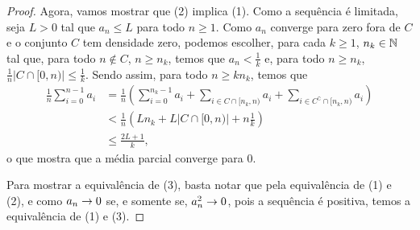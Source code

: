 \begin{proof}
Agora, vamos mostrar que (2) implica (1). Como a sequência é limitada, seja $L>0$ tal que $a_n \leq L$ para todo $n \geq 1$. Como $a_n$ converge para zero fora de $C$ e o conjunto $C$ tem densidade zero, podemos escolher, para cada $k \geq 1$, $n_k \in \mathbb{N}$ tal que, para todo $n \notin C$, $n \geq n_k$, temos que $a_n < \frac{1}{k}$ e, para todo $n \geq n_k$, $\frac{1}{n}|C \cap [0,n)| \leq \frac{1}{k}$. Sendo assim, para todo $n \geq kn_k$, temos que
	\begin{align*}
	\frac{1}{n} \sum_{i=0}^{n-1} a_i &= \frac{1}{n} \left(\sum_{i=0}^{n_k-1} a_i   +   \sum_{i \in C \cap [n_k,n)} a_i    +    \sum_{i \in C^\complement \cap [n_k,n)} a_i \right) \\
	& < \frac{1}{n} \left(Ln_k + L |C \cap [0,n)| + n\frac{1}{k}\right) \\
	& \leq \frac{2L+1}{k},
	\end{align*}
o que mostra que a média parcial converge para $0$.

 Para mostrar a equivalência de (3), basta notar que pela equivalência de (1) e (2), e como $a_n \rightarrow 0$ se, e somente se, $a_n^2 \rightarrow 0$, pois a sequência é positiva, temos a equivalência de (1) e (3).
\end{proof}

